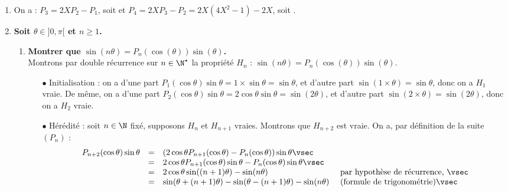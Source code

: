 \documentclass[a4paper, 11pt,reqno]{article}
\begin{document}
\begin{correction}  \;
	\begin{enumerate}
		\item On a : $P_3 = 2XP_2-P_1$, soit  et $P_4 = 2XP_3-P_2=2X(4X^2-1)-2X$, soit .
		\item \textbf{Soit $\theta\in\rbrack 0,\pi\lbrack$ et $n\geq 1$.}
		      \begin{enumerate}
			      \item \textbf{Montrer que $\sin{(n\theta)}=P_n(\cos{(\theta)})\sin{(\theta)}$.}\\
			            Montrons par double r\'ecurrence sur $n \in \N^\star$ la propri\'et\'e $H_n$ : $\sin{(n\theta)}=P_n(\cos{(\theta)})\sin{(\theta)}$.\\
			            \begin{itemize}
				            \item[$\bullet$] Initialisation : on a d'une part $P_1(\cos \theta) \sin\theta= 1 \times \sin \theta = \sin \theta$, et d'autre part $\sin(1 \times \theta) = \sin \theta$, donc on a $H_1$ vraie. De m\^eme,  on a d'une part $P_2(\cos \theta) \sin \theta= 2 \cos \theta \sin \theta = \sin (2\theta)$, et d'autre part $\sin(2 \times \theta) = \sin (2\theta)$, donc on a $H_2$ vraie.
				            \item[$\bullet$] H\'er\'edit\'e : soit $n\in \N$ fix\'e, supposons $H_n$ et $H_{n+1}$ vraies. Montrons que $H_{n+2}$ est vraie.
				                  On a, par d\'efinition de la suite $(P_n)$ :
				                  $$\begin{array}{rcll}
						                  P_{n+2}(\cos \theta) \sin \theta & = & (2 \cos \theta  P_{n+1}(\cos \theta)   - P_{n}(\cos \theta)) \sin \theta \vsec                                                              \\
						                                                   & = & 2 \cos \theta  P_{n+1}(\cos \theta) \sin \theta   - P_{n}(\cos \theta) \sin \theta \vsec                                                    \\
						                                                   & = & 2 \cos \theta  \sin((n+1)\theta) - \sin (n\theta)                                        & \textmd{ par hypoth\`ese de r\'ecurrence, }\vsec \\
						                                                   & = & \sin(\theta + (n+1)\theta) - \sin( \theta - (n+1)\theta) - \sin(n\theta)                 & \textmd{ (formule de trigonom\'etrie)} \vsec     \\

\end{array}$$
\end{itemize}
\end{enumerate}
\end{enumerate}
\end{correction}
\end{document}
